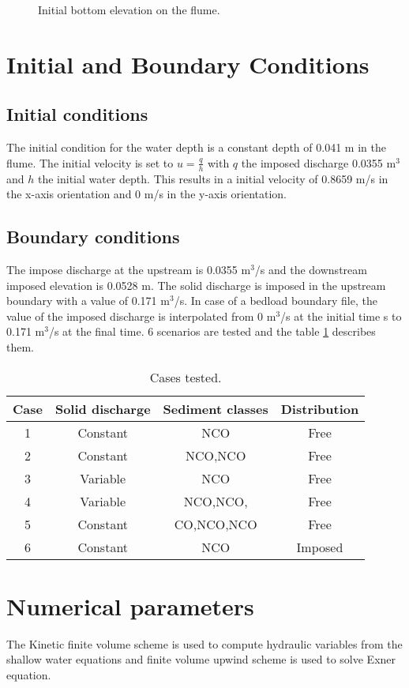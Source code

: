 \begin{figure}[H]
 \centering
 \caption{Initial bottom elevation on the flume.}
 \label{flumebc:bottom}
\end{figure}
%
\section{Initial and Boundary Conditions}

\subsection{Initial conditions}
%
The initial condition for the water depth is a constant depth of 0.041 m in the flume. The initial velocity is set to $u=\frac{q}{h}$ with $q$ the imposed discharge 0.0355 m$^3$ and $h$ the initial water depth. This results in a initial velocity of 0.8659 m/s in the x-axis orientation and 0 m/s in the y-axis orientation.
%
\subsection{Boundary conditions}
%
The impose discharge at the upstream is 0.0355 m$^3$/s and the downstream imposed elevation is 0.0528 m.
%
The solid discharge is imposed in the upstream boundary with a value of 0.171 m$^3$/s. In case of a bedload boundary file, the value of the imposed discharge is interpolated from 0 m$^3$/s at the initial time s to 0.171 m$^3$/s at the final time.
%
6 scenarios are tested and the table \ref{flumebc:scenarii} describes them.
%
\begin{table}[h]
\centering
\begin{tabular}{|*{4}{c|}}
\hline
Case & Solid discharge & Sediment classes & Distribution\\
\hline
1 & Constant & NCO & Free\\
\hline
2 & Constant & NCO,NCO & Free\\
\hline
3 & Variable & NCO & Free\\
\hline
4 & Variable & NCO,NCO, & Free\\
\hline
5 & Constant & CO,NCO,NCO & Free\\
\hline
6 & Constant & NCO & Imposed\\
\hline
\end{tabular}
\caption{Cases tested.}
\label{flumebc:scenarii}
\end{table}
%
\section{Numerical parameters}
%
The Kinetic finite volume scheme is used to compute hydraulic variables from the shallow water equations and finite volume upwind scheme is used to solve Exner equation.
%
